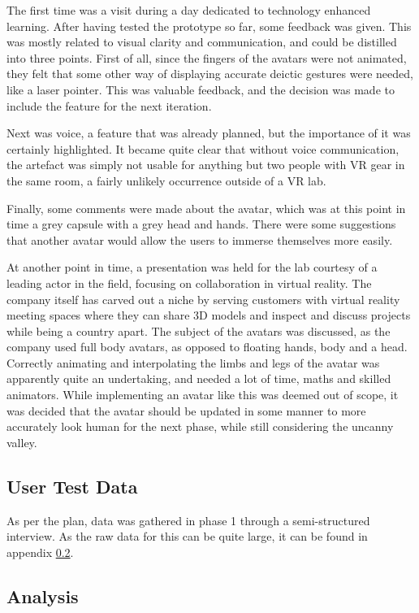 The first time was a visit during a day dedicated to technology enhanced learning. After having tested the prototype so far, some feedback was given. This was mostly related to visual clarity and communication, and could be distilled into three points. First of all, since the fingers of the avatars were not animated, they felt that some other way of displaying accurate deictic gestures were needed, like a laser pointer. This was valuable feedback, and the decision was made to include the feature for the next iteration. 

Next was voice, a feature that was already planned, but the importance of it was certainly highlighted. It became quite clear that without voice communication, the artefact was simply not usable for anything but two people with VR gear in the same room, a fairly unlikely occurrence outside of a VR lab.

Finally, some comments were made about the avatar, which was at this point in time a grey capsule with a grey head and hands. There were some suggestions that another avatar would allow the users to immerse themselves more easily. 

At another point in time, a presentation was held for the lab courtesy of a leading actor in the field, focusing on collaboration in virtual reality. The company itself has carved out a niche by serving customers with virtual reality meeting spaces where they can share 3D models and inspect and discuss projects while being a country apart. The subject of the avatars was discussed, as the company used full body avatars, as opposed to floating hands, body and a head. Correctly animating and interpolating the limbs and legs of the avatar was apparently quite an undertaking, and needed a lot of time, maths and skilled animators. While implementing an avatar like this was deemed out of scope, it was decided that the avatar should be updated in some manner to more accurately look human for the next phase, while still considering the uncanny valley. 



\subsection{User Test Data}
As per the plan, data was gathered in phase 1 through a semi-structured interview. As the raw data for this can be quite large, it can be found in appendix \ref{}.


\subsection{Analysis}
